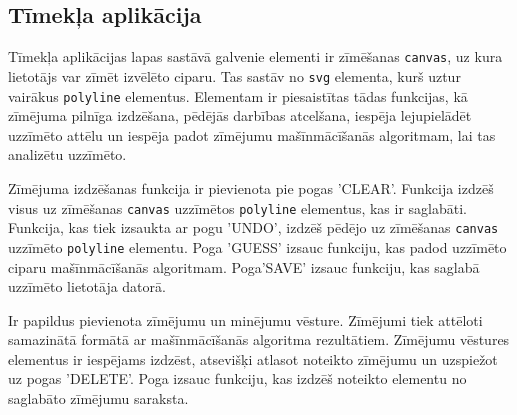 \subsection{Tīmekļa aplikācija}
Tīmekļa aplikācijas lapas sastāvā galvenie elementi ir zīmēšanas \texttt{canvas}, uz kura lietotājs var zīmēt izvēlēto ciparu. Tas sastāv no \texttt{svg} elementa, kurš uztur vairākus \texttt{polyline} elementus. Elementam ir piesaistītas tādas funkcijas, kā zīmējuma pilnīga izdzēšana, pēdējās darbības atcelšana, iespēja lejupielādēt uzzīmēto attēlu un iespēja padot zīmējumu mašīnmācīšanās algoritmam, lai tas analizētu uzzīmēto.
\par Zīmējuma izdzēšanas funkcija ir pievienota pie pogas 'CLEAR'. Funkcija izdzēš visus uz zīmēšanas \texttt{canvas} uzzīmētos \texttt{polyline} elementus, kas ir saglabāti. Funkcija, kas tiek izsaukta ar pogu 'UNDO', izdzēš pēdējo uz zīmēšanas \texttt{canvas} uzzīmēto \texttt{polyline} elementu. Poga 'GUESS' izsauc funkciju, kas padod uzzīmēto ciparu mašīnmācīšanās algoritmam. Poga'SAVE' izsauc funkciju, kas saglabā uzzīmēto lietotāja datorā.
\par Ir papildus pievienota zīmējumu un minējumu vēsture. Zīmējumi tiek attēloti samazinātā formātā ar mašīnmācīšanās algoritma rezultātiem. Zīmējumu vēstures elementus ir iespējams izdzēst, atsevišķi atlasot noteikto zīmējumu un uzspiežot uz pogas 'DELETE'. Poga izsauc funkciju, kas izdzēš noteikto elementu no saglabāto zīmējumu saraksta.
